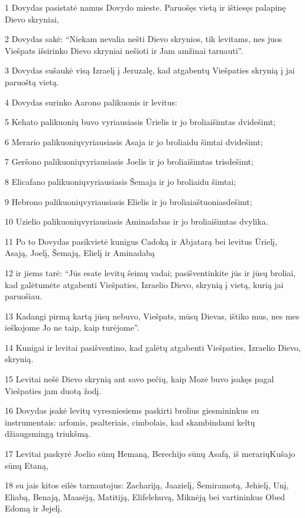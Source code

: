 \par 1 Dovydas pasistatė namus Dovydo mieste. Paruošęs vietą ir ištiesęs palapinę Dievo skryniai, 
\par 2 Dovydas sakė: “Niekam nevalia nešti Dievo skrynios, tik levitams, nes juos Viešpats išsirinko Dievo skryniai nešioti ir Jam amžinai tarnauti”. 
\par 3 Dovydas sušaukė visą Izraelį į Jeruzalę, kad atgabentų Viešpaties skrynią į jai paruoštą vietą. 
\par 4 Dovydas surinko Aarono palikuonis ir levitus: 
\par 5 Kehato palikuonių buvo vyriausiasis Ūrielis ir jo broliai­šimtas dvidešimt; 
\par 6 Merario palikuonių­vyriausiasis Asaja ir jo broliai­du šimtai dvidešimt; 
\par 7 Geršono palikuonių­vyriausiasis Joelis ir jo broliai­šimtas trisdešimt; 
\par 8 Elicafano palikuonių­vyriausiasis Šemaja ir jo broliai­du šimtai; 
\par 9 Hebrono palikuonių­vyriausiasis Elielis ir jo broliai­aštuoniasdešimt; 
\par 10 Uzielio palikuonių­vyriausiasis Aminadabas ir jo broliai­šimtas dvylika. 
\par 11 Po to Dovydas pasikvietė kunigus Cadoką ir Abjatarą bei levitus Ūrielį, Asają, Joelį, Šemają, Elielį ir Aminadabą 
\par 12 ir jiems tarė: “Jūs esate levitų šeimų vadai; pasišventinkite jūs ir jūsų broliai, kad galėtumėte atgabenti Viešpaties, Izraelio Dievo, skrynią į vietą, kurią jai paruošiau. 
\par 13 Kadangi pirmą kartą jūsų nebuvo, Viešpats, mūsų Dievas, ištiko mus, nes mes ieškojome Jo ne taip, kaip turėjome”. 
\par 14 Kunigai ir levitai pasišventino, kad galėtų atgabenti Viešpaties, Izraelio Dievo, skrynią. 
\par 15 Levitai nešė Dievo skrynią ant savo pečių, kaip Mozė buvo įsakęs pagal Viešpaties jam duotą žodį. 
\par 16 Dovydas įsakė levitų vyresniesiems paskirti brolius giesmininkus su instrumentais: arfomis, psalteriais, cimbolais, kad skambindami keltų džiaugsmingą triukšmą. 
\par 17 Levitai paskyrė Joelio sūnų Hemaną, Berechijo sūnų Asafą, iš merarių­Kušajo sūnų Etaną, 
\par 18 su jais kitos eilės tarnautojus: Zachariją, Jaazielį, Šemiramotą, Jehielį, Unį, Eliabą, Benają, Maasėją, Matitiją, Elifelehuvą, Miknėją bei vartininkus Obed Edomą ir Jejelį. 
